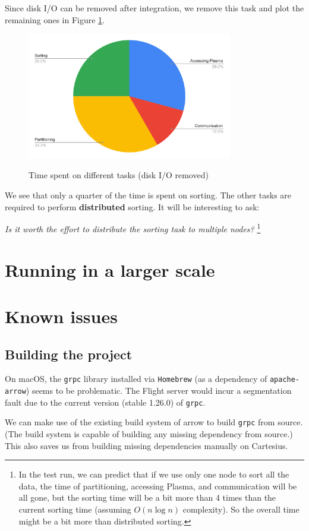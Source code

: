 \documentclass{article}
\begin{document}
Since disk I/O can be removed after integration, we remove this task and plot the remaining ones in Figure \ref{fig:time_of_tasks}.

\begin{figure}[h!]
    \caption{Time spent on different tasks (disk I/O removed)}
    \centering
      \includegraphics[width=0.8\textwidth]{time_of_tasks}
    \label{fig:time_of_tasks}
\end{figure}

We see that only a quarter of the time is spent on sorting.
The other tasks are required to perform \textbf{distributed} sorting.
It will be interesting to ask: 

\textit{Is it worth the effort to distribute the sorting task to multiple nodes?}
\footnote{In the test run, we can predict that if we use only one node to sort all the data,
the time of partitioning, accessing Plasma, and communication will be all gone,
 but the sorting time will be a bit more than 4 times than the current sorting time (assuming $O(n\log{}n)$ complexity).
So the overall time might be a bit more than distributed sorting.}

\section{Running in a larger scale}

\newpage
\appendix
\section{Known issues}
\subsection{Building the project}

On macOS, the \texttt{grpc} library installed via \texttt{Homebrew} (as a dependency of \texttt{apache-arrow}) seems to be problematic.
The Flight server would incur a segmentation fault due to the current version (stable 1.26.0) of \texttt{grpc}.

We can make use of the existing build system of arrow to build \texttt{grpc} from source.
(The build system is capable of building any missing dependency from source.)
This also saves us from building missing dependencies manually on Cartesius.
\end{document}
